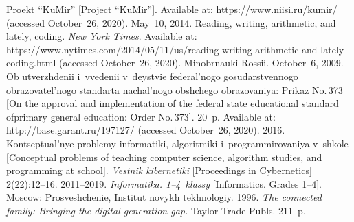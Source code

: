 \begin{multicols}{2}
{{\begin{thebibliography}{99}
Proekt ``KuMir'' [Project ``KuMir'']. Available at: {\sf https://www.niisi.ru/kumir/} (accessed October~26, 2020).
 May~10, 2014. Reading, writing, arithmetic, and lately, coding. \textit{New York Times}. 
Available at: {\sf https://www.nytimes.com/2014/05/11/us/reading-writing-arithmetic-and-lately-coding.html} 
(accessed October~26, 2020).
Minobrnauki Rossii. October~6, 2009. Ob utverzhdenii i~vvedenii v~deystvie federal'nogo 
gosudarstvennogo obrazovatel'nogo standarta nachal'nogo obshchego obrazovaniya: Prikaz No.\,373 
[On the approval and implementation of the federal state educational standard of\linebreak primary general 
education: Order No.\,373]. 20~p. Available at: {\sf http://base.garant.ru/197127/} (accessed 
October~26, 2020).
 2016. Kontseptual'nye problemy informatiki, algoritmiki i~programmirovaniya 
v~shkole [Conceptual problems of teaching computer science, algorithm studies, and programming at school]. 
\textit{Vestnik kibernetiki} [Proceedings in Cybernetics] 2(22):12--16.
 2011--2019. \textit{Informatika. 1--4~klassy}
 [Informatics. Grades 1--4]. Moscow: Prosveshchenie, Institut novykh tekhnologiy. 
 1996. \textit{The connected family: Bringing the digital generation gap.} Taylor 
Trade Publs. 211~p.

\columnbreak


\end{thebibliography}}}
\end{multicols}
